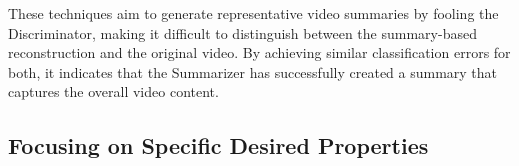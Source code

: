 These techniques aim to generate representative video summaries by fooling the Discriminator, making it difficult to distinguish between the summary-based reconstruction and the original video. By achieving similar classification errors for both, it indicates that the Summarizer has successfully created a summary that captures the overall video content.

%     

\subsection{Focusing on Specific Desired Properties}
\label{subsec:rel-unsup-specific-properties}





